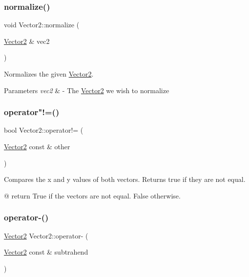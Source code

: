 \subsubsection{\texorpdfstring{normalize()}{normalize()}}
{\footnotesize\ttfamily void Vector2\+::normalize (\begin{DoxyParamCaption}\item[{\hyperlink{structVector2}{Vector2} \&}]{vec2 }\end{DoxyParamCaption})\hspace{0.3cm}{\ttfamily [static]}}

Normalizes the given \hyperlink{structVector2}{Vector2}.


\begin{DoxyParams}{Parameters}
{\em vec2} & -\/ The \hyperlink{structVector2}{Vector2} we wish to normalize \\
\hline
\end{DoxyParams}
\mbox{\label{structVector2_af967d99b507dae58826def2a2552daac}} 
\subsubsection{\texorpdfstring{operator"!=()}{operator!=()}}
{\footnotesize\ttfamily bool Vector2\+::operator!= (\begin{DoxyParamCaption}\item[{\hyperlink{structVector2}{Vector2} const \&}]{other }\end{DoxyParamCaption})}

Compares the x and y values of both vectors. Returns true if they are not equal.

@ return True if the vectors are not equal. False otherwise. \mbox{\label{structVector2_a3329f629c89b6627014a407b378933c8}} 
\subsubsection{\texorpdfstring{operator-\/()}{operator-()}}
{\footnotesize\ttfamily \hyperlink{structVector2}{Vector2} Vector2\+::operator-\/ (\begin{DoxyParamCaption}\item[{\hyperlink{structVector2}{Vector2} const \&}]{subtrahend }\end{DoxyParamCaption})}

